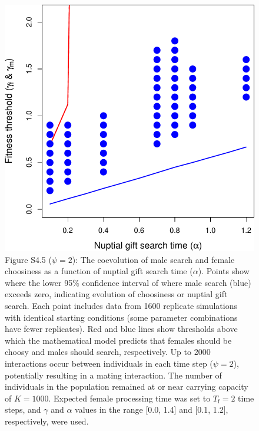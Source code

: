 \documentclass[
]{article}
\begin{document}
\captionsetup{labelformat=default}

\clearpage

\captionsetup{labelformat=empty}

\begin{figure}
\centering
\includegraphics{ms_refs_fixed_files/figure-latex/unnamed-chunk-10-1.pdf}
\caption{Figure S4.5 (\(\psi = 2\)): The coevolution of male search and
female choosiness as a function of nuptial gift search time
(\(\alpha\)). Points show where the lower 95\% confidence interval of
where male search (blue) exceeds zero, indicating evolution of
choosiness or nuptial gift search. Each point includes data from 1600
replicate simulations with identical starting conditions (some parameter
combinations have fewer replicates). Red and blue lines show thresholds
above which the mathematical model predicts that females should be
choosy and males should search, respectively. Up to 2000 interactions
occur between individuals in each time step (\(\psi = 2\)), potentially
resulting in a mating interaction. The number of individuals in the
population remained at or near carrying capacity of \(K = 1000\).
Expected female processing time was set to \(T_{\mathrm{f}}=2\) time
steps, and \(\gamma\) and \(\alpha\) values in the range {[}0.0, 1.4{]}
and {[}0.1, 1.2{]}, respectively, were used.}
\end{figure}
\end{document}
